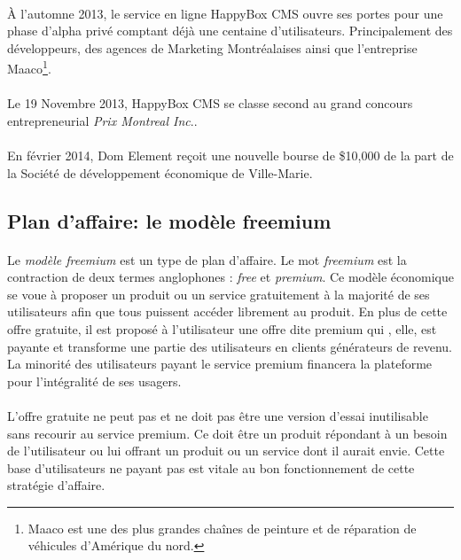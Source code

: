 \documentclass[11pt, a4paper ]{article}
\begin{document}
\begin{spacing}{1.5}
\paragraph{}
À l'automne 2013, le service en ligne HappyBox CMS ouvre ses portes pour une phase d'alpha privé comptant déjà une centaine d'utilisateurs. Principalement des développeurs, des agences de Marketing Montréalaises ainsi que l'entreprise Maaco\footnote{Maaco est une des plus grandes chaînes de peinture et de réparation de véhicules d'Amérique du nord.}.

\paragraph{}
Le 19 Novembre 2013, HappyBox CMS se classe second au grand concours entrepreneurial \emph{Prix Montreal Inc}..

\paragraph{}
En février 2014, Dom Element reçoit une nouvelle bourse de \$10,000 de la part de la Société de développement économique de Ville-Marie.

			\subsection{Plan d'affaire: le modèle freemium} %

\paragraph{}
Le \emph{modèle freemium} est un type de plan d'affaire. Le mot \emph{freemium} est la contraction de deux termes anglophones : \emph{free} et \emph{premium}. Ce modèle économique se voue à proposer un produit ou un service gratuitement à la majorité de ses utilisateurs afin que tous puissent accéder librement au produit. En plus de cette offre gratuite, il est proposé à l'utilisateur une offre dite premium qui , elle, est payante et transforme une partie des utilisateurs en clients générateurs de revenu. La minorité des utilisateurs payant le service premium financera la plateforme pour l'intégralité de ses usagers.


\paragraph{} %
L'offre gratuite ne peut pas et ne doit pas être une version d'essai inutilisable sans recourir au service premium. Ce doit être un produit répondant à un besoin de l'utilisateur ou lui offrant un produit ou un service dont il aurait envie. Cette base d'utilisateurs ne payant pas est vitale au bon fonctionnement de cette stratégie d'affaire.


\end{spacing}
\end{document}
